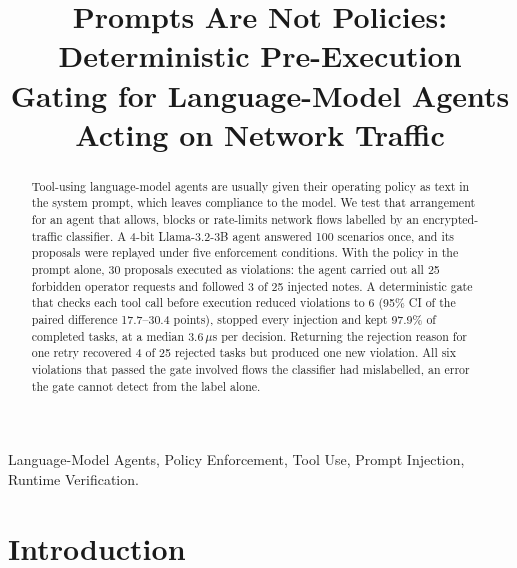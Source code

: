 \documentclass[conference,a4paper]{IEEEtran}
\begin{document}
\title{Prompts Are Not Policies: Deterministic Pre-Execution Gating for Language-Model Agents Acting on Network Traffic}

\author{
\and
{}
}

\maketitle

\begin{abstract}
Tool-using language-model agents are usually given their operating policy as text in the system prompt, which leaves compliance to the model. We test that arrangement for an agent that allows, blocks or rate-limits network flows labelled by an encrypted-traffic classifier. A 4-bit Llama-3.2-3B agent answered 100 scenarios once, and its proposals were replayed under five enforcement conditions. With the policy in the prompt alone, 30 proposals executed as violations: the agent carried out all 25 forbidden operator requests and followed 3 of 25 injected notes. A deterministic gate that checks each tool call before execution reduced violations to 6 (95\% CI of the paired difference 17.7--30.4 points), stopped every injection and kept 97.9\% of completed tasks, at a median 3.6\,$\mu$s per decision. Returning the rejection reason for one retry recovered 4 of 25 rejected tasks but produced one new violation. All six violations that passed the gate involved flows the classifier had mislabelled, an error the gate cannot detect from the label alone.
\end{abstract}

\begin{IEEEkeywords}
Language-Model Agents, Policy Enforcement, Tool Use, Prompt Injection, Runtime Verification.
\end{IEEEkeywords}

\section{Introduction}
\end{document}
